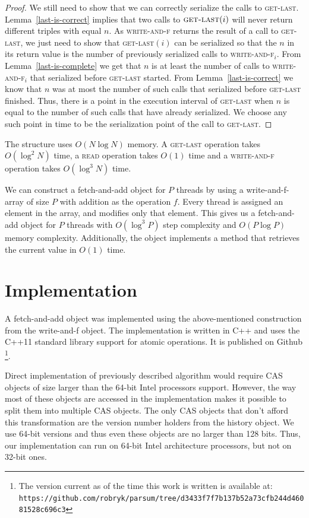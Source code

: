 \documentclass{thesis}
\newcommand{\fn}[1]{\textsc{#1}}
\begin{document}
\begin{proof}
	We still need to show that we can correctly serialize the calls to \fn{get-last}. Lemma~\ref{last-is-correct} implies that two calls to $\fn{get-last}(i)$ will never return different triples with equal $n$. As \fn{write-and-f} returns
	the result of a call to \fn{get-last}, we just need to show that \fn{get-last}$(i)$ can be serialized so that the $n$ in its return value is the number of previously serialized calls to \fn{write-and-f$_i$}. From
	Lemma~\ref{last-is-complete} we get that $n$ is at least the number of calls to \fn{write-and-f$_i$} that serialized before \fn{get-last} started. From Lemma~\ref{last-is-correct} we know that $n$ was at most the number of such calls
	that serialized before \fn{get-last} finished. Thus, there is a point in the execution interval of \fn{get-last} when $n$ is equal to the number of such calls that have already serialized. We choose any such point in time to be the serialization
	point of the call to \fn{get-last}.
\end{proof}

The structure uses $O(N\log{}N)$ memory. A \fn{get-last} operation takes $O(\log^2 N)$ time, a \fn{read} operation takes $O(1)$ time and a \fn{write-and-f} operation takes $O(\log^3 N)$ time.

We can construct a fetch-and-add object for $P$ threads by using a write-and-f-array of size $P$ with addition as the operation $f$. Every thread is assigned an element in the array, and modifies only that element. This gives us
a fetch-and-add object for $P$ threads with $O(\log^3 P)$ step complexity and $O(P\log P)$ memory complexity. Additionally, the object implements a method that retrieves the
current value in $O(1)$ time.

\chapter{Implementation}
A fetch-and-add object was implemented using the above-mentioned construction from the write-and-f object. The implementation is written in C++ and uses the C++11 standard library support for atomic operations. It is published on Github \footnote{The version current as of the time this work is written is available at: \verb+https://github.com/robryk/parsum/tree/d3433f7f7b137b52a73cfb244d46081528c696c3+ }.

Direct implementation of previously described algorithm would require CAS objects of size larger than the
64-bit Intel processors support. However, the way most of these objects are accessed in the implementation makes
it possible to split them into multiple CAS objects. The only CAS objects that don't afford this transformation
are the version number holders from the history object. We use 64-bit versions and thus even these objects are
no larger than 128 bits. Thus, our implementation can run on 64-bit Intel architecture processors, but not on 32-bit ones.
\end{document}
